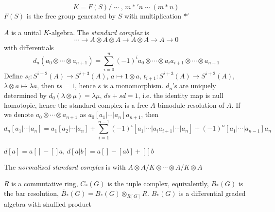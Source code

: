 \documentclass[main]{subfiles}
\begin{document}
\begin{construction}
\[K=F(S)/\sim,\,m*'n\sim(m*n)\]
$F(S)$ is the free group generated by $S$ with multiplication $*'$
\end{construction}

\begin{definition}
$A$ is a unital $K$-algebra. The \textit{standard complex} is
\[\cdots\to A\otimes A\otimes A\to A\otimes A\to A\to 0\]
with differentials
\[d_n(a_0\otimes\cdots\otimes a_{n+1})=\sum_{i=0}^n(-1)^ia_0\otimes\cdots\otimes a_ia_{i+1}\otimes\cdots\otimes a_{n+1}\]
Define $s_i:S^{i+2}(A)\to S^{i+3}(A)$, $a\mapsto1\otimes a$, $t_{i+1}:S^{i+3}(A)\to S^{i+2}(A)$, $\lambda\otimes a\mapsto\lambda a$, then $ts=1$, hence $s$ is a monomorphism. $d_n$'s are uniquely determined by $d_0(\lambda\otimes\mu)=\lambda\mu$, $ds+sd=1$, i.e. the identity map is null homotopic, hence the standard complex is a free $A$ bimodule resolution of $A$. If we denote $a_0\otimes\cdots\otimes a_{n+1}$ as $a_0[a_1|\cdots|a_n]a_{n+1}$, then
\[d_n[a_1|\cdots| a_{n}]=a_1[a_2|\cdots|a_n]+\sum_{i=1}^{n-1}(-1)^i[a_1|\cdots| a_ia_{i+1}|\cdots| a_{n}]+(-1)^n[a_1|\cdots|a_{n-1}]a_n\]
\end{definition}

\begin{example}
$d[a]=a[]-[]a$, $d[a|b]=a[]-[ab]+[]b$
\end{example}

\begin{definition}
The \textit{normalized standard complex} is with $A\otimes A/K\otimes\cdots\otimes A/K\otimes A$
\end{definition}

\begin{definition}
$R$ is a commutative ring, $C_*(G)$ is the tuple complex, equivalently, $B_*(G)$ is the bar resolution, $\bar B_*(G)=B_*(G)\otimes_{R[G]}R$. $B_*(G)$ is a differential graded algebra with shuffled product
\end{definition}
\end{document}
